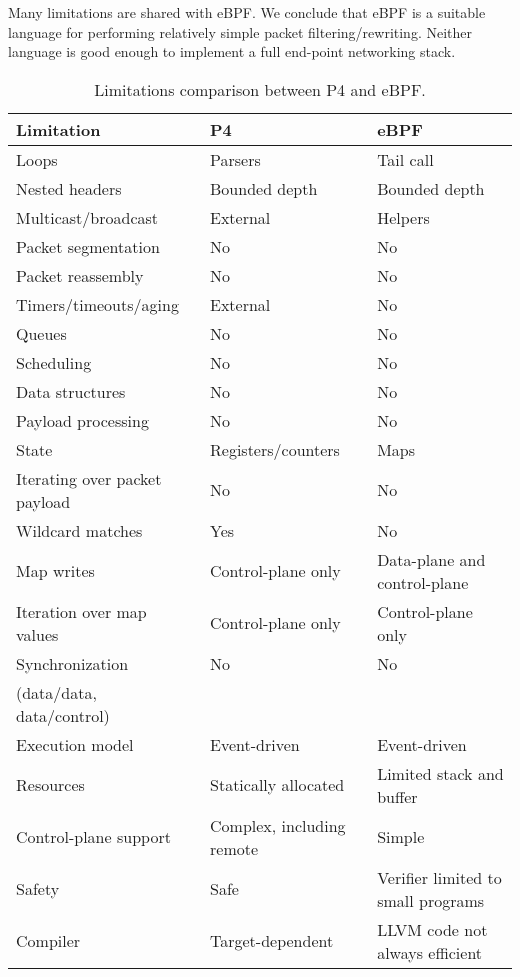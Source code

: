 Many limitations are shared with eBPF.  We conclude that eBPF is a
suitable language for performing relatively simple packet
filtering/rewriting.  Neither language is good enough to implement a
full end-point networking stack.

\begin{table*}[h]
  \footnotesize
  \begin{center}
  \begin{tabular}{|l|l|l|} \hline
    \textbf{Limitation} & \textbf{P4} & \textbf{eBPF} \\ \hline \hline
    Loops & Parsers & Tail call \\ \hline
    Nested headers & Bounded depth & Bounded depth \\ \hline
    Multicast/broadcast & External & Helpers \\ \hline
    Packet segmentation & No & No \\ \hline
    Packet reassembly &	No & No \\ \hline
    Timers/timeouts/aging & External & No \\ \hline
    Queues & No & No \\ \hline
    Scheduling & No & No \\ \hline
    Data structures & No & No \\ \hline
    Payload processing & No & No \\ \hline
    State & Registers/counters & Maps \\ \hline
    Iterating over packet payload & No & No \\ \hline
    Wildcard matches & Yes & No \\ \hline
    Map writes & Control-plane only & Data-plane and control-plane \\ \hline
    Iteration over map values & Control-plane only & Control-plane only \\ \hline
    Synchronization & No & No \\
    (data/data, data/control) & & \\ \hline
    Execution model & Event-driven & Event-driven \\ \hline
    Resources & Statically allocated & Limited stack and buffer \\ \hline
    Control-plane support & Complex, including remote & Simple \\ \hline
    Safety & Safe & Verifier limited to small programs \\ \hline
    Compiler & Target-dependent & LLVM code not always efficient \\ \hline
  \end{tabular}
  \caption{Limitations comparison between P4 and eBPF.}\label{table:limitations}
  \end{center}
\end{table*}
